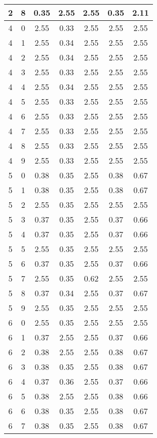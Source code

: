 \begin{longtable}{|c|c||c||c|c||c|c|}
	2 & 8 & 0.35 & 2.55 & 2.55 & 0.35 & 2.11 \\ \hline
	4 & 0 & 2.55 & 0.33 & 2.55 & 2.55 & 2.55 \\ \hline
	4 & 1 & 2.55 & 0.34 & 2.55 & 2.55 & 2.55 \\ \hline
	4 & 2 & 2.55 & 0.34 & 2.55 & 2.55 & 2.55 \\ \hline
	4 & 3 & 2.55 & 0.33 & 2.55 & 2.55 & 2.55 \\ \hline
	4 & 4 & 2.55 & 0.34 & 2.55 & 2.55 & 2.55 \\ \hline
	4 & 5 & 2.55 & 0.33 & 2.55 & 2.55 & 2.55 \\ \hline
	4 & 6 & 2.55 & 0.33 & 2.55 & 2.55 & 2.55 \\ \hline
	4 & 7 & 2.55 & 0.33 & 2.55 & 2.55 & 2.55 \\ \hline
	4 & 8 & 2.55 & 0.33 & 2.55 & 2.55 & 2.55 \\ \hline
	4 & 9 & 2.55 & 0.33 & 2.55 & 2.55 & 2.55 \\ \hline
	5 & 0 & 0.38 & 0.35 & 2.55 & 0.38 & 0.67 \\ \hline
	5 & 1 & 0.38 & 0.35 & 2.55 & 0.38 & 0.67 \\ \hline
	5 & 2 & 2.55 & 0.35 & 2.55 & 2.55 & 2.55 \\ \hline
	5 & 3 & 0.37 & 0.35 & 2.55 & 0.37 & 0.66 \\ \hline
	5 & 4 & 0.37 & 0.35 & 2.55 & 0.37 & 0.66 \\ \hline
	5 & 5 & 2.55 & 0.35 & 2.55 & 2.55 & 2.55 \\ \hline
	5 & 6 & 0.37 & 0.35 & 2.55 & 0.37 & 0.66 \\ \hline
	5 & 7 & 2.55 & 0.35 & 0.62 & 2.55 & 2.55 \\ \hline
	5 & 8 & 0.37 & 0.34 & 2.55 & 0.37 & 0.67 \\ \hline
	5 & 9 & 2.55 & 0.35 & 2.55 & 2.55 & 2.55 \\ \hline
	6 & 0 & 2.55 & 0.35 & 2.55 & 2.55 & 2.55 \\ \hline
	6 & 1 & 0.37 & 2.55 & 2.55 & 0.37 & 0.66 \\ \hline
	6 & 2 & 0.38 & 2.55 & 2.55 & 0.38 & 0.67 \\ \hline
	6 & 3 & 0.38 & 0.35 & 2.55 & 0.38 & 0.67 \\ \hline
	6 & 4 & 0.37 & 0.36 & 2.55 & 0.37 & 0.66 \\ \hline
	6 & 5 & 0.38 & 2.55 & 2.55 & 0.38 & 0.66 \\ \hline
	6 & 6 & 0.38 & 0.35 & 2.55 & 0.38 & 0.67 \\ \hline
	6 & 7 & 0.38 & 0.35 & 2.55 & 0.38 & 0.67 \\ \hline

\end{longtable}

